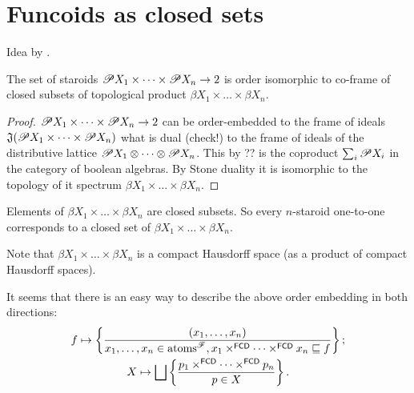 \chapter{Funcoids as closed sets}

Idea \cite{nlab-topogeny} by .



\begin{thm}
The set of staroids
$\mathscr{P} X_1\times\dots\times\mathscr{P} X_n\to 2$ is
order isomorphic to co-frame of closed subsets of topological
product $\beta X_1\times\dots\times\beta X_n$.
\end{thm}

\begin{proof}
$\mathscr{P} X_1\times\dots\times\mathscr{P} X_n\to 2$ can be order-embedded to
the frame of ideals
$\mathfrak{J}(\mathscr{P} X_1\times\dots\times\mathscr{P} X_n)$ what is
dual (check!) to the frame of ideals of the distributive lattice
$\mathscr{P} X_1\otimes\dots\otimes\mathscr{P} X_n$.
This by ?? is the coproduct $\sum_i \mathscr{P} X_i$ in the category
of boolean algebras.
By Stone duality it is isomorphic to the topology of it spectrum
$\beta X_1\times\dots\times\beta X_n$.
\end{proof}

Elements of $\beta X_1\times\dots\times\beta X_n$ are closed
subsets. So every $n$-staroid one-to-one corresponds to a closed
set of $\beta X_1\times\dots\times\beta X_n$.

Note that $\beta X_1\times\dots\times\beta X_n$ is a compact
Hausdorff space (as a product of compact Hausdorff spaces).

It seems that there is an easy way to describe the above order
embedding in both directions:
\begin{gather*}
f\mapsto
\setcond{(x_1,\dots,x_n)}{
x_1,\dots,x_n\in\atoms^\mathscr{F},
x_1\times^{\mathsf{FCD}}\dots\times^{\mathsf{FCD}}x_n\sqsubseteq f};\\
X\mapsto \bigsqcup
\setcond{p_1\times^{\mathsf{FCD}}\dots\times^{\mathsf{FCD}}p_n}{
p\in X}.
\end{gather*}

